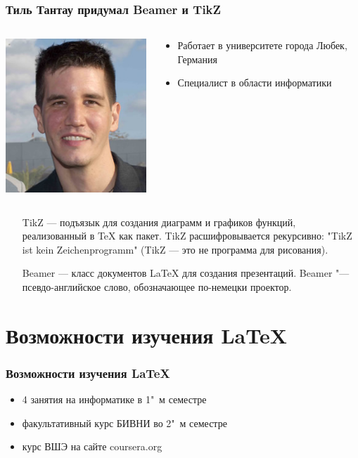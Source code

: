 \documentclass[10pt,pdf,hyperref={unicode}]{beamer}
\begin{document}
\begin{frame}
    \frametitle{Тиль Тантау придумал Beamer и TikZ}
    \begin{columns}[c]
        \begin{column}{0.5\textwidth}
            \includegraphics[keepaspectratio,height=0.5\textheight]{till_tantau.jpg}
        \end{column}
        \begin{column}{0.5\textwidth}
            \begin{itemize}
                \item Работает в университете города Любек, Германия
                \item Специалист в области информатики  
            \end{itemize}
        \end{column}
    \end{columns}
    \vfill
    \begin{itemize}
        \item[TikZ] --- подъязык для создания диаграмм и графиков функций, реализованный в \TeX{} как пакет. TikZ расшифровывается рекурсивно: "TikZ ist kein Zeichenprogramm"  (TikZ --- это не программа для рисования).
        \item[Beamer] --- класс документов \LaTeX{} для создания презентаций. Beamer "--- псевдо-английское слово, обозначающее по-немецки проектор. 
    \end{itemize}    
\end{frame}
\section{Возможности изучения \LaTeX}
\begin{frame}
    \frametitle{Возможности изучения \LaTeX}
    
    \begin{itemize}
        \item 4 занятия на информатике в 1"~м семестре 
        \item факультативный курс БИВНИ во 2"~м семестре
        \item курс ВШЭ на сайте coursera.org
        \end{itemize}
\end{frame}
\end{document}

